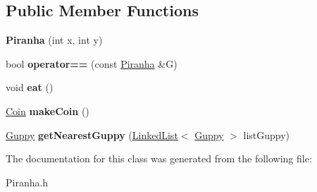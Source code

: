 \subsection*{Public Member Functions}
\begin{DoxyCompactItemize}
\item 
\mbox{\label{class_piranha_a78b80929a5c5d8e1d82477026fb1a1e9}} 
{\bfseries Piranha} (int x, int y)
\item 
\mbox{\label{class_piranha_a3c16f356d1f90a0ca33caa0d5cc8f931}} 
bool {\bfseries operator==} (const \mbox{\hyperlink{class_piranha}{Piranha}} \&G)
\item 
\mbox{\label{class_piranha_ac48c0256edd56c427b3d82f6e0d4df82}} 
void {\bfseries eat} ()
\item 
\mbox{\label{class_piranha_a288fe5baeae95af1ce3afaae77f3bf1d}} 
\mbox{\hyperlink{class_coin}{Coin}} {\bfseries make\+Coin} ()
\item 
\mbox{\label{class_piranha_a93ba25800a80842e52e42adaede6aae0}} 
\mbox{\hyperlink{class_guppy}{Guppy}} {\bfseries get\+Nearest\+Guppy} (\mbox{\hyperlink{class_linked_list}{Linked\+List}}$<$ \mbox{\hyperlink{class_guppy}{Guppy}} $>$ list\+Guppy)
\end{DoxyCompactItemize}


The documentation for this class was generated from the following file\+:\begin{DoxyCompactItemize}
\item 
Piranha.\+h\end{DoxyCompactItemize}
